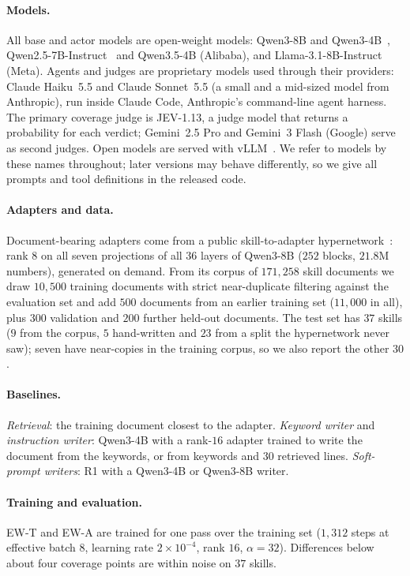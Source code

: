 \documentclass[11pt]{article}
\newcommand{\EWT}{\textsc{EW-T}}
\newcommand{\EWA}{\textsc{EW-A}}
\begin{document}
\paragraph{Models.} All base and actor models are open-weight models: Qwen3-8B and Qwen3-4B~\cite{qwen3}, Qwen2.5-7B-Instruct~\cite{qwen25} and Qwen3.5-4B
(Alibaba), and Llama-3.1-8B-Instruct~\cite{llama3} (Meta). Agents and judges are proprietary models used through their providers: Claude Haiku~5.5
and Claude Sonnet~5.5 (a small and a mid-sized model from Anthropic), run inside Claude Code, Anthropic's
command-line agent harness. The primary coverage judge is JEV-1.13, a judge model that returns a probability for each verdict; Gemini~2.5 Pro and
Gemini~3 Flash (Google) serve as second judges. Open models are served with vLLM~\cite{vllm}. We refer to models by these names throughout; later
versions may behave differently, so we give all prompts and tool definitions in the released code.

\paragraph{Adapters and data.} Document-bearing adapters come from a public skill-to-adapter hypernetwork~\cite{latentskill}: rank $8$ on all seven
projections of all $36$ layers of Qwen3-8B ($252$ blocks, $21.8$M numbers), generated on demand. From its corpus of $171{,}258$ skill documents we
draw $10{,}500$ training documents with strict near-duplicate filtering against the evaluation set and add $500$ documents from an earlier
training set ($11{,}000$ in all), plus $300$ validation and $200$ further held-out documents. The test set has $37$ skills ($9$ from the corpus, $5$ hand-written and $23$ from a split the hypernetwork never saw); seven have near-copies
in the training corpus, so we also report the other $30$.

\paragraph{Baselines.} \emph{Retrieval}: the training document closest to the adapter. \emph{Keyword writer} and \emph{instruction writer}:
Qwen3-4B with a rank-$16$ adapter trained to write the document from the keywords, or from keywords and $30$ retrieved lines. \emph{Soft-prompt
writers}: R1 with a Qwen3-4B or Qwen3-8B writer.

\paragraph{Training and evaluation.} \EWT{} and \EWA{} are trained for one pass over the training set ($1{,}312$ steps at effective batch
$8$, learning rate $2\times10^{-4}$, rank $16$, $\alpha=32$). Differences below about four coverage points are within noise on $37$ skills.
\end{document}
